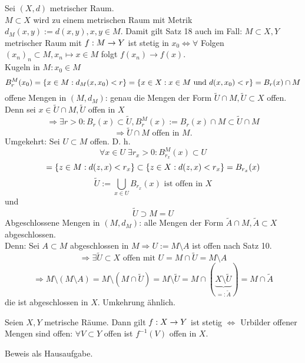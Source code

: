 \documentclass[../ana2.tex]{subfiles}
\begin{document}
\begin{bem}
    Sei \( (X, d) \) metrischer Raum. \\
    \(M \subset X\) wird zu einem metrischen Raum mit Metrik
    \( d_M(x,y) := d(x, y), x, y \in M \).
    Damit gilt Satz 18 auch im Fall:
    \( M \subset X, Y \) metrischer Raum mit \( f:M\rightarrow Y \)
    ist stetig in \(x_0 \Leftrightarrow \forall \) Folgen
    \( (x_n)_n \subset M, x_n \mapsto x \in M \) folgt
    \( f(x_n) \rightarrow f(x) \). \\
    Kugeln in \( M: x_0 \in M \)
    \[ B_r^M(x_0) = \{x \in M: d_M(x,x_0) < r\}
    = \{x \in X: x \in M \text{ und } d(x, x_0) < r\}
    = B_r(x) \cap M \]
    offene Mengen in \( (M, d_M) \): genau die Mengen der
    Form \( \tilde{U} \cap M, \tilde{U} \subset X \) offen.\\
    Denn sei \( x \in \tilde{U} \cap M, \tilde{U}\) offen in \(X\)
    \[ \Rightarrow \exists r > 0: B_r(x) \subset \tilde{U},
    B_r^M(x)  := B_r(x) \cap M \subset \tilde{U} \cap M \]
    \[ \Rightarrow \tilde{U} \cap M \text{ offen in } M. \]
    Umgekehrt: Sei \( U \subset M \) offen. D. h.
    \[ \forall x \in U \; \exists r_x > 0: B_{r_x}^M(x) \subset U \]
    \[ = \{z \in M: d(z,x) < r_x\} \subset \{z \in X: d(z,x) < r_x\}
    = B_{r_x}(x) \]
    \[ \tilde{U} := \bigcup_{x \in U} B_{r_x}(x) \text{ ist offen in } X \]
    und
    \[ \tilde{U} \supset M = U \]
    Abgeschlossene Mengen in \( (M, d_M) \): alle Mengen der Form
    \( \tilde{A} \cap M, \tilde{A} \subset X \) abgeschlossen.\\
    Denn: Sei \(A \subset M\) abgeschlossen in \( M \Rightarrow
    U := M \setminus A \) ist offen nach Satz 10. 
    \[ \Rightarrow \exists \tilde{U} \subset X \text{ offen mit }
    U = M \cap \tilde{U} = M \setminus A \]
    \[ \Rightarrow M \setminus (M \setminus A) 
    = M \setminus (M \cap \tilde{U}) = M \setminus \tilde{U}
    = M \cap (\underbrace{X \setminus \tilde{U}}_{=: \tilde{A}}) 
    = M \cap \tilde{A} \]
    die ist abgeschlossen in \(X\). Umkehrung ähnlich.    
\end{bem}
\begin{satz}
    Seien \( X, Y \) metrische Räume. Dann gilt \( f:X\rightarrow Y \)
    ist stetig \( \Leftrightarrow \) Urbilder offener Mengen sind offen:
    \( \forall V \subset Y \) offen ist \( f^{-1}(V) \) offen in \( X \).
\end{satz}
\begin{bew}
    Beweis als Hausaufgabe.
\end{bew}
\end{document}
